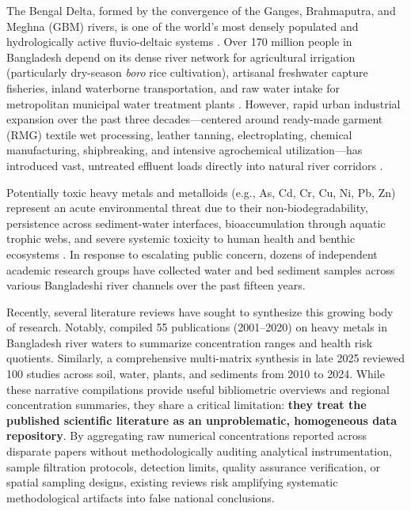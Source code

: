 \documentclass[authoryear,preprint,12pt]{elsarticle}
\begin{document}
The Bengal Delta, formed by the convergence of the Ganges, Brahmaputra, and Meghna (GBM) rivers, is one of the world's most densely populated and hydrologically active fluvio-deltaic systems \citep{Goodbred1999}. Over 170 million people in Bangladesh depend on its dense river network for agricultural irrigation (particularly dry-season \textit{boro} rice cultivation), artisanal freshwater capture fisheries, inland waterborne transportation, and raw water intake for metropolitan municipal water treatment plants \citep{BBS2022,Chowdhury2004}. However, rapid urban industrial expansion over the past three decades---centered around ready-made garment (RMG) textile wet processing, leather tanning, electroplating, chemical manufacturing, shipbreaking, and intensive agrochemical utilization---has introduced vast, untreated effluent loads directly into natural river corridors \citep{Islam2015,Bhuiyan2015,Hasan2024}.

Potentially toxic heavy metals and metalloids (e.g., As, Cd, Cr, Cu, Ni, Pb, Zn) represent an acute environmental threat due to their non-biodegradability, persistence across sediment-water interfaces, bioaccumulation through aquatic trophic webs, and severe systemic toxicity to human health and benthic ecosystems \citep{Hakanson1980,Jarup2003,Tchounwou2012}. In response to escalating public concern, dozens of independent academic research groups have collected water and bed sediment samples across various Bangladeshi river channels over the past fifteen years. 

Recently, several literature reviews have sought to synthesize this growing body of research. Notably, \citet{Pandit2025} compiled 55 publications (2001--2020) on heavy metals in Bangladesh river waters to summarize concentration ranges and health risk quotients. Similarly, a comprehensive multi-matrix synthesis in late 2025 reviewed 100 studies across soil, water, plants, and sediments from 2010 to 2024. While these narrative compilations provide useful bibliometric overviews and regional concentration summaries, they share a critical limitation: \textbf{they treat the published scientific literature as an unproblematic, homogeneous data repository}. By aggregating raw numerical concentrations reported across disparate papers without methodologically auditing analytical instrumentation, sample filtration protocols, detection limits, quality assurance verification, or spatial sampling designs, existing reviews risk amplifying systematic methodological artifacts into false national conclusions.
\end{document}
